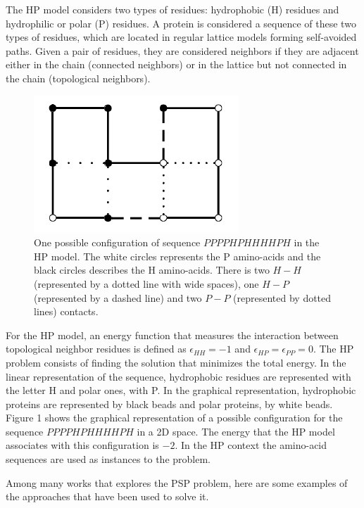 \documentclass[conference]{IEEEtran}
\begin{document}
The HP model considers two types of residues:  hydrophobic (H) residues  and hydrophilic or polar (P) residues. A protein is considered a sequence of these two types of residues, which are located in regular lattice models forming self-avoided paths. Given a pair of residues, they are considered neighbors if they are adjacent  either in the chain (connected neighbors) or  in the lattice but not connected in the chain (topological neighbors).


\begin{figure}[htb!] \label{fig:PROTEXAM}
	\centering
	\includegraphics[scale=0.7]{figures/proteinExample.png}
	\caption{One possible configuration of  sequence $PPPPHPHHHHPH$ in the HP model. The white circles represents the P amino-acids and the black circles describes the H amino-acids. There is two $H-H$ (represented by a dotted line with wide spaces), one $H-P$ (represented by a dashed line) and  two $P-P$  (represented by dotted lines) contacts.}
\end{figure}




For the HP model, an energy function that  measures the interaction between topological  neighbor residues is defined  as  $\epsilon_{HH}=-1$ and $\epsilon_{HP}=\epsilon_{PP}=0$. The HP problem consists of finding the solution that minimizes the total energy. In the linear representation of the sequence, hydrophobic residues are represented with the letter H and polar ones, with P. In the graphical representation, hydrophobic proteins are represented  by black beads and polar proteins, by white beads.  Figure 1 shows the graphical representation of a possible configuration for  the sequence  $PPPPHPHHHHPH$ in a 2D space. The energy that the HP model associates with this configuration is $-2$. In the HP context the amino-acid sequences are used as instances to the problem.


Among many works that explores the PSP problem, here are some examples of the approaches that have been used to solve it.
\end{document}

